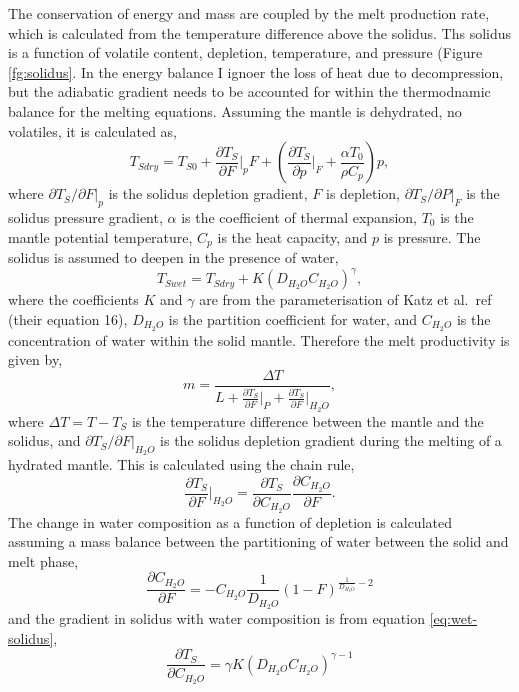The conservation of energy and mass are coupled by the melt production rate, which is calculated from the temperature difference above the solidus. Ths solidus is a function of volatile content, depletion, temperature, and pressure (Figure \ref{fg:solidus}. In the energy balance I ignoer the loss of heat due to decompression, but the adiabatic gradient needs to be accounted for within the thermodnamic balance for the melting equations. Assuming the mantle is dehydrated, no volatiles, it is calculated as,
\begin{equation}
T_{Sdry} = T_{S0} + \frac{\partial T_{S}}{\partial F}\vert_{p}F + \left(\frac{\partial T_{S}}{\partial p}\vert_{F} + \frac{\alpha T_{0}}{\rho C_{p}}\right)p,
\label{eq:dry-solidus}
\end{equation}
where $\partial T_{S}/\partial F\vert_{p}$ is the solidus depletion gradient, $F$ is depletion, $\partial T_{S}/\partial P\vert_{F}$ is the solidus pressure gradient, $\alpha$ is the coefficient of thermal expansion, $T_{0}$ is the mantle potential temperature, $C_{p}$ is the heat capacity, and $p$ is pressure. The solidus is assumed to deepen in the presence of water,
\begin{equation}
T_{Swet} = T_{Sdry} + K\left(D_{H_{2}O}C_{H_{2}O}\right)^{\gamma},
\label{eq:wet-solidus}
\end{equation}
where the coefficients $K$ and $\gamma$ are from the parameterisation of Katz et al.~ref \cite{katz-etal-2003} (their equation 16), $D_{H_{2}O}$ is the partition coefficient for water, and $C_{H_{2}O}$ is the concentration of water within the solid mantle. Therefore the melt productivity is given by,
\begin{equation}
m = \frac{\Delta T}{L + \frac{\partial T_{S}}{\partial F}\vert_{P} + \frac{\partial T_{S}}{\partial F}\vert_{H_{2}O}},
\label{eq:melt-productivity}
\end{equation}
where $\Delta T = T-T_{S}$ is the temperature difference between the mantle and the solidus, and $\partial T_{S}/\partial F\vert_{H_{2}O}$ is the solidus depletion gradient during the melting of a hydrated mantle. This is calculated using the chain rule,
\begin{equation}
\frac{\partial T_{S}}{\partial F}\vert_{H_{2}O} = \frac{\partial T_{S}}{\partial C_{H_{2}O}} \frac{\partial C_{H_{2}O}}{\partial F}.
\end{equation}
The change in water composition as a function of depletion is calculated  assuming a mass balance between the partitioning of water between the solid and melt phase,
\begin{equation}
\frac{\partial C_{H_{2}O}}{\partial F} = -C_{H_{2}O} \frac{1}{D_{H_{2}O}}\left(1-F\right)^{\frac{1}{D_{H_{2}O}}-2}
\end{equation}
and the gradient in solidus with water composition is from equation \ref{eq:wet-solidus},
\begin{equation}
\frac{\partial T_{S}}{\partial C_{H_{2}O}} = \gamma K\left(D_{H_{2}O}C_{H_{2}O}\right)^{\gamma-1}
\end{equation}

